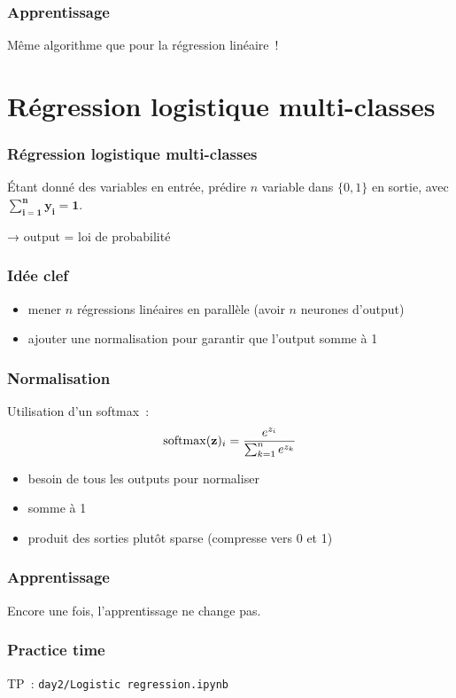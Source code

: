 \documentclass{formation}
\begin{document}
\begin{frame}
  \frametitle{Apprentissage}

  Même algorithme que pour la régression linéaire !
\end{frame}


\section{Régression logistique multi-classes}

\begin{frame}
  \frametitle{Régression logistique multi-classes}
  Étant donné des variables en entrée, prédire $n$ variable dans
  $\{0, 1\}$ en sortie, avec $\mathbf{\sum_{i = 1}^n y_i = 1}$.

  → output = loi de probabilité
\end{frame}

\begin{frame}
  \frametitle{Idée clef}
  \begin{itemize}
  \item mener $n$ régressions linéaires en parallèle (avoir $n$
    neurones d'output)
  \item ajouter une normalisation pour garantir que l'output somme à 1
  \end{itemize}
\end{frame}

\begin{frame}
  \frametitle{Normalisation}

  Utilisation d'un softmax :
  \[
    \softmax(\mathbf{z})_i = \frac{e^{z_i}}{\sum_{k=1}^n e^{z_k}}
  \]
  \begin{itemize}[<+->]
  \item besoin de tous les outputs pour normaliser
  \item somme à 1
  \item produit des sorties plutôt sparse (compresse vers 0 et 1)
  \end{itemize}
\end{frame}

\begin{frame}
  \frametitle{Apprentissage}

  Encore une fois, l'apprentissage ne change pas.

\end{frame}

\begin{frame}
  \frametitle{Practice time}

  TP : \texttt{day2/Logistic regression.ipynb}
\end{frame}
\end{document}
